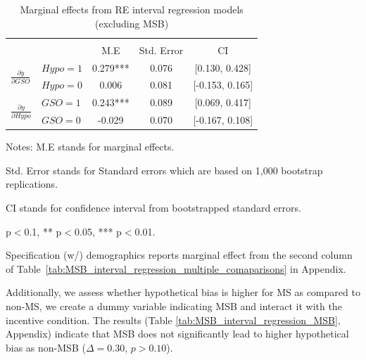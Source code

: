 \documentclass[12pt]{article}
\begin{document}
\begin{table}[H]
\centering
\footnotesize
\caption{Marginal effects from RE interval regression models (excluding MSB)}
\label{tab: Robustness}
\begin{tabular}{llccc}
\toprule
 & &  \\
 & & M.E & Std. Error & CI \\ \midrule
{} & $Hypo=1$ & 0.279*** &  0.076& [0.130, 0.428] \\ & $Hypo=0$ & 0.006 & 0.081 & [-0.153, 0.165] \\
                                                     \midrule
{}& $GSO=1$ & 0.243*** &  0.089 & [0.069, 0.417]\\ & $GSO=0$ & -0.029 & 0.070 & [-0.167, 0.108] \\
                                                       \bottomrule
\end{tabular}
\begin{tablenotes}
\footnotesize
\item Notes: M.E stands for marginal effects.
\item Std. Error stands for Standard errors which are based on 1,000 bootstrap replications.
\item CI stands for confidence interval from bootstrapped standard errors.
\item * p$<$0.1, ** p$<$0.05, *** p$<$0.01.
\item Specification (w/) demographics reports marginal effect from the second column of Table~\ref{tab:MSB_interval_regression_multiple_comaparisons} in Appendix.
\end{tablenotes}
\end{table}

Additionally, we assess whether hypothetical bias is higher for MS as compared to non-MS, we create a dummy variable indicating MSB and interact it with the incentive condition. The results (Table \ref{tab:MSB_interval_regression_MSB}, Appendix) indicate that MSB does not significantly lead to higher hypothetical bias as non-MSB (\(\Delta = 0.30\), \(p > 0.10\)). 
\end{document}
